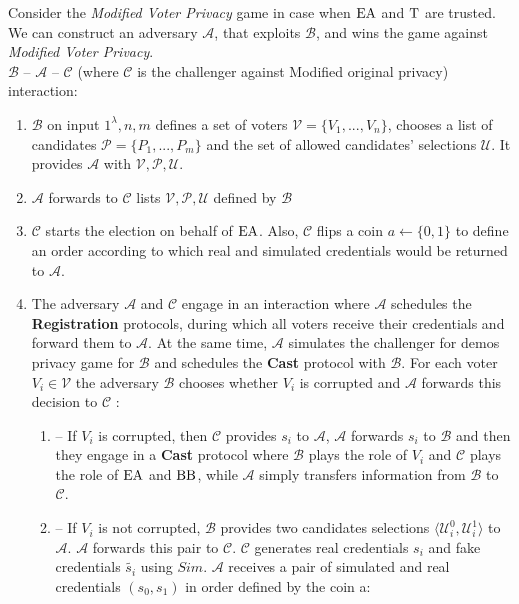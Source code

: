 Consider the \textit{Modified Voter Privacy} game in case when $\operatorname{EA}$ and $\operatorname{T}$ are trusted. We can construct an adversary $\mathcal{A}$, that exploits $\mathcal{B}$, and wins the game against \textit{Modified Voter Privacy}.\\
$\mathcal{B}$ -- $\mathcal{A}$ -- $\mathcal{C}$ (where $\mathcal{C}$ is the challenger against Modified original privacy) interaction: 
\begin{enumerate}
\item $\mathcal{B}$ on input $1^{\lambda},n,m$ defines a set of voters  $\mathcal{V} = \{V_1,...,V_n\}$, chooses a list of candidates  $\mathcal{P} = \{P_1,...,P_m\}$ and the set of allowed candidates' selections $\mathcal{U}$.  It provides $\mathcal{A}$ with $\mathcal{V}, \mathcal{P}, \mathcal{U}$.
 \item $\mathcal{A}$ forwards to $\mathcal{C}$  lists $\mathcal{V}, \mathcal{P}, \mathcal{U}$ defined by $\mathcal{B}$
 \item  $\mathcal{C}$ starts the election on behalf of $\operatorname{EA}$. Also, $\mathcal{C}$ flips a coin $a \leftarrow \{0,1\}$ to define an order according to which real and simulated credentials would be returned to $\mathcal{A}$. 
 \item The adversary $\mathcal{A}$  and $\mathcal{C}$ engage in an interaction where $\mathcal{A}$ schedules the \textbf{Registration} protocols, during which all voters receive their credentials and forward them to $\mathcal{A}$. At the same time, $\mathcal{A}$ simulates the challenger for demos privacy game for $\mathcal{B}$ and schedules the  \textbf{Cast}  protocol with $\mathcal{B}$. For each voter  $V_i \in \mathcal{V}$ the adversary $\mathcal{B}$  chooses whether $V_i$ is corrupted and $\mathcal{A}$ forwards this decision to $\mathcal{C}$ :
 \begin{enumerate}
\item[] -- If $V_i$ is corrupted, then $\mathcal{C}$ provides $s_i$ to $\mathcal{A}$,  $\mathcal{A}$ forwards $s_i$ to $\mathcal{B}$ and then they engage in a \textbf{Cast} protocol where  $\mathcal{B}$ plays the role of $V_i$ and  $\mathcal{C}$ plays the role of $\operatorname{EA}$ and $\operatorname{BB}$, while $\mathcal{A}$ simply transfers information from $\mathcal{B}$ to $\mathcal{C}$.
\item[] --  If $V_i$ is not corrupted, $\mathcal{B}$ provides two candidates selections $\langle \mathcal{U}^0_i , \mathcal{U}^1_i \rangle$ to $\mathcal{A}$. $\mathcal{A}$ forwards this pair to $\mathcal{C}$.  $\mathcal{C}$ generates real credentials $s_i$ and fake credentials $\tilde{s_i}$ using $Sim$. $\mathcal{A}$ receives a pair of simulated and real credentials $(s_0,s_1)$ in order defined by the coin a:

\end{enumerate}
\end{enumerate}
